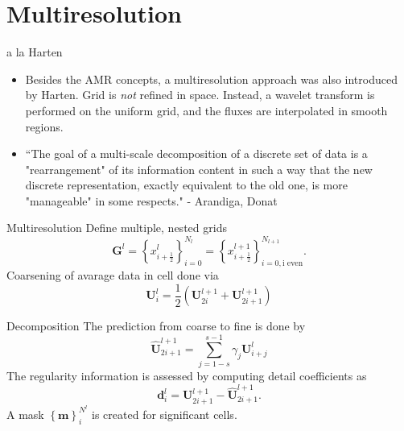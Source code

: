 \documentclass{beamer}
\begin{document}
\section{Multiresolution}

\begin{frame}{a la Harten}
    \begin{itemize}
        \item<2-> Besides the AMR concepts, a multiresolution approach was also introduced by
            Harten. Grid is \textit{not} refined in space. Instead, a wavelet
            transform is performed on the uniform grid, and the fluxes are
            interpolated in smooth regions. \\
        \item<3->``The goal of a multi-scale decomposition of a discrete set of
            data is a "rearrangement" of its information content in such a way
            that the new discrete representation, exactly equivalent to the old
            one, is more "manageable" in some respects." - Arandiga, Donat
    \end{itemize}
\end{frame}

\begin{frame}{Multiresolution}
    Define multiple, nested grids
    \begin{equation*}
        \mathbf{G}^{l} = \left\{ x^{l}_{i+\frac{1}{2}} \right\}_{i=0}^{N_{l}} =
            \left\{ x^{l+1}_{i+\frac{1}{2}} \right\}_{i=0,\text{i even}}^{N_{l+1}}.
    \end{equation*}
    Coarsening of avarage data in cell done via
    \begin{equation*}
        \mathbf{U}^{l}_{i} = \frac{1}{2} \left( \mathbf{U}^{l+1}_{2i} + \mathbf{U}^{l+1}_{2i+1} \right)
    \end{equation*}
\end{frame}

\begin{frame}{Decomposition}
    The prediction from coarse to fine is done by
    \begin{equation*}
        \mathbf{\hat{U}}^{l+1}_{2i+1} = \sum_{j=1-s}^{s-1} \gamma_{j} \mathbf{U}^{l}_{i+j}
    \end{equation*}
    The regularity information is assessed by computing detail coefficients as
    \begin{equation*}
        \mathbf{d}^{l}_{i} = \mathbf{U}^{l+1}_{2i+1} - \mathbf{\hat{U}}^{l+1}_{2i+1}.
    \end{equation*}
    A mask $\left\{ \mathbf{m} \right\}_{i}^{N^{l}}$ is created for significant cells.
\end{frame}
\end{document}
